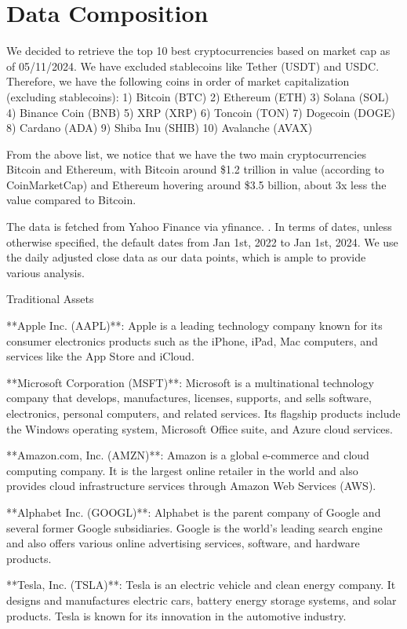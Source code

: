 \section{Data Composition}

We decided to retrieve the top 10 best cryptocurrencies based on market cap as of 05/11/2024. We have excluded stablecoins like Tether (USDT) and USDC. Therefore, we have the following coins in order of market capitalization (excluding stablecoins): 
1) Bitcoin (BTC)
2) Ethereum (ETH)
3) Solana (SOL)
4) Binance Coin (BNB)
5) XRP (XRP)
6) Toncoin (TON)
7) Dogecoin (DOGE)
8) Cardano (ADA)
9) Shiba Inu (SHIB)
10) Avalanche (AVAX)

From the above list, we notice that we have the two main cryptocurrencies Bitcoin and Ethereum, with Bitcoin around \$1.2 trillion in value (according to CoinMarketCap) and Ethereum hovering around \$3.5 billion, about 3x less the value compared to Bitcoin.

The data is fetched from Yahoo Finance via yfinance. \cite{yfinance}. In terms of dates, unless otherwise specified, the default dates from Jan 1st, 2022 to Jan 1st, 2024. We use the daily adjusted close data as our data points, which is ample to provide various analysis.

Traditional Assets

**Apple Inc. (AAPL)**: Apple is a leading technology company known for its consumer electronics products such as the iPhone, iPad, Mac computers, and services like the App Store and iCloud.

**Microsoft Corporation (MSFT)**: Microsoft is a multinational technology company that develops, manufactures, licenses, supports, and sells software, electronics, personal computers, and related services. Its flagship products include the Windows operating system, Microsoft Office suite, and Azure cloud services.

**Amazon.com, Inc. (AMZN)**: Amazon is a global e-commerce and cloud computing company. It is the largest online retailer in the world and also provides cloud infrastructure services through Amazon Web Services (AWS).

**Alphabet Inc. (GOOGL)**: Alphabet is the parent company of Google and several former Google subsidiaries. Google is the world’s leading search engine and also offers various online advertising services, software, and hardware products.

**Tesla, Inc. (TSLA)**: Tesla is an electric vehicle and clean energy company. It designs and manufactures electric cars, battery energy storage systems, and solar products. Tesla is known for its innovation in the automotive industry.

